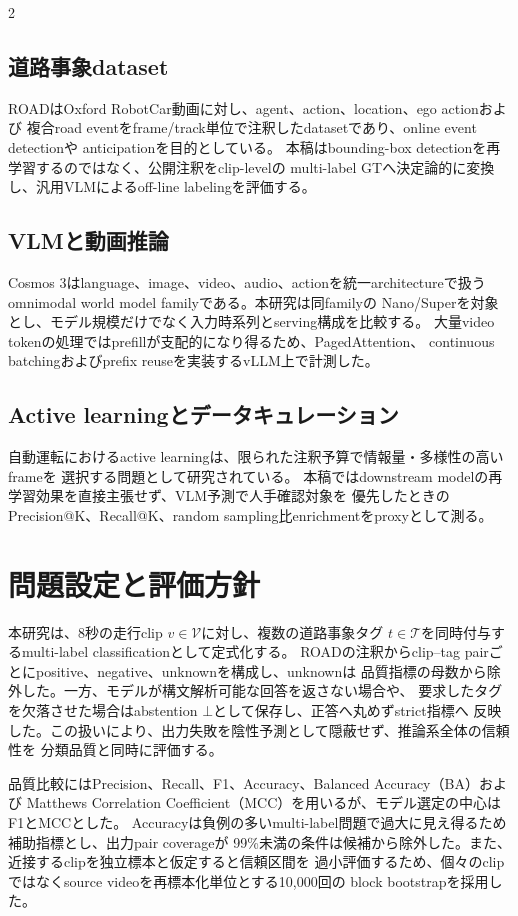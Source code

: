 \documentclass[9pt,a4paper]{extarticle}
\begin{document}
\begin{multicols}{2}
\subsection{道路事象dataset}
ROADはOxford RobotCar動画に対し、agent、action、location、ego actionおよび
複合road eventをframe/track単位で注釈したdatasetであり、online event detectionや
anticipationを目的としている\cite{singh2022road,maddern2017robotcar}。
本稿はbounding-box detectionを再学習するのではなく、公開注釈をclip-levelの
multi-label GTへ決定論的に変換し、汎用VLMによるoff-line labelingを評価する。

\subsection{VLMと動画推論}
Cosmos 3はlanguage、image、video、audio、actionを統一architectureで扱う
omnimodal world model familyである\cite{nvidia2026cosmos3}。本研究は同familyの
Nano/Superを対象とし、モデル規模だけでなく入力時系列とserving構成を比較する。
大量video tokenの処理ではprefillが支配的になり得るため、PagedAttention、
continuous batchingおよびprefix reuseを実装するvLLM\cite{kwon2023vllm}上で計測した。

\subsection{Active learningとデータキュレーション}
自動運転におけるactive learningは、限られた注釈予算で情報量・多様性の高いframeを
選択する問題として研究されている\cite{lin2024active,bengar2019temporal}。
本稿ではdownstream modelの再学習効果を直接主張せず、VLM予測で人手確認対象を
優先したときのPrecision@K、Recall@K、random sampling比enrichmentをproxyとして測る。

\section{問題設定と評価方針}
本研究は、8秒の走行clip $v\in\mathcal{V}$に対し、複数の道路事象タグ
$t\in\mathcal{T}$を同時付与するmulti-label classificationとして定式化する。
ROADの注釈からclip--tag pairごとにpositive、negative、unknownを構成し、unknownは
品質指標の母数から除外した。一方、モデルが構文解析可能な回答を返さない場合や、
要求したタグを欠落させた場合はabstention $\bot$として保存し、正答へ丸めずstrict指標へ
反映した。この扱いにより、出力失敗を陰性予測として隠蔽せず、推論系全体の信頼性を
分類品質と同時に評価する。

品質比較にはPrecision、Recall、F1、Accuracy、Balanced Accuracy（BA）および
Matthews Correlation Coefficient（MCC）を用いるが、モデル選定の中心はF1とMCCとした。
Accuracyは負例の多いmulti-label問題で過大に見え得るため補助指標とし、出力pair coverageが
99\%未満の条件は候補から除外した。また、近接するclipを独立標本と仮定すると信頼区間を
過小評価するため、個々のclipではなくsource videoを再標本化単位とする10,000回の
block bootstrapを採用した。


\end{multicols}
\end{document}
